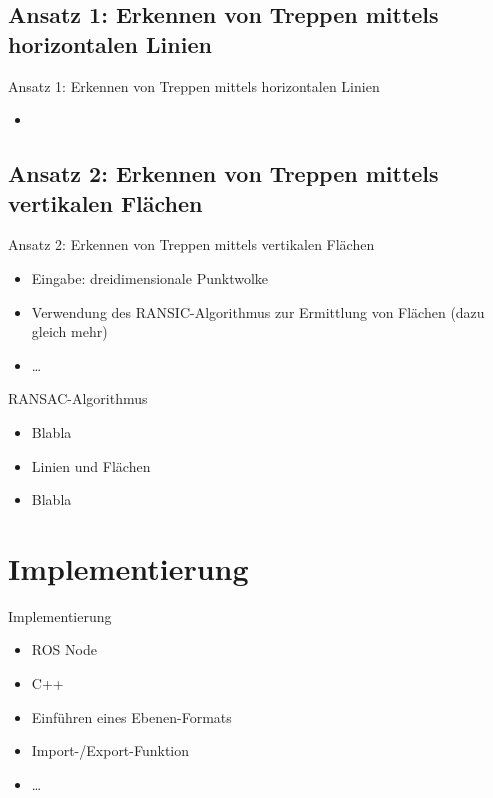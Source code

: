 \documentclass[18pt]{beamer}
\begin{document}
\subsection{Ansatz 1: Erkennen von Treppen mittels horizontalen Linien}
\begin{frame}{Ansatz 1: Erkennen von Treppen mittels horizontalen Linien}
\begin{itemize}
	\item
\end{itemize}
\end{frame}


\subsection{Ansatz 2: Erkennen von Treppen mittels vertikalen Flächen}
\begin{frame}{Ansatz 2: Erkennen von Treppen mittels vertikalen Flächen}
\begin{itemize}
	\item Eingabe: dreidimensionale Punktwolke
	\item Verwendung des RANSIC-Algorithmus zur Ermittlung von Flächen (dazu gleich mehr)
	\item \dots
\end{itemize}
\end{frame}

\begin{frame}{RANSAC-Algorithmus}
\begin{itemize}
	\item Blabla
	\item Linien und Flächen
	\item Blabla
\end{itemize}
\end{frame}



\section{Implementierung}

\begin{frame}{Implementierung}
\begin{itemize}
	\item ROS Node
	\item C++
	\item Einführen eines Ebenen-Formats
	\item Import-/Export-Funktion
	\item \dots
\end{itemize}
\end{frame}
\end{document}
